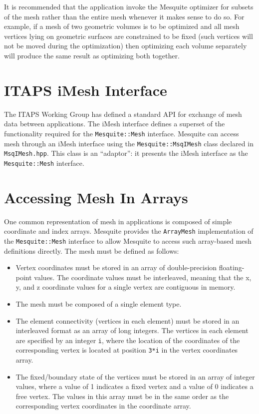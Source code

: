 It is recommended that the application invoke the Mesquite optimizer for subsets
of the mesh rather than the entire mesh whenever it makes sense to do so.  For
example, if a mesh of two geometric volumes is to be optimized and all mesh
vertices lying on geometric surfaces are constrained to be fixed (such vertices
will not be moved during the optimization) then optimizing each volume separately
will produce the same result as optimizing both together.  


\section{ITAPS iMesh Interface}

The ITAPS Working Group has defined a standard API for exchange of mesh data between applications.  The iMesh interface\cite{imesh} defines a superset of the functionality required for the \texttt{Mesquite::Mesh} interface.  Mesquite can access mesh through an iMesh interface using the \texttt{Mesquite::MsqIMesh} class declared in \texttt{MsqIMesh.hpp}.  This class is an ``adaptor'':  it presents the iMesh interface as the \texttt{Mesquite::Mesh} interface.  


\section{Accessing Mesh In Arrays} \label{sec::ArrayMesh}

One common representation of mesh in applications is composed of simple 
coordinate and index arrays.  Mesquite provides the \texttt{ArrayMesh} implementation of the \texttt{Mesquite::Mesh} interface to allow Mesquite
to access such array-based mesh definitions directly.  The mesh must be
defined as follows:
\begin{itemize}
\item Vertex coordinates must be stored in an array of double-precision
      floating-point values.  The coordinate values must be interleaved,
      meaning that the x, y, and z coordinate values for a single vertex
      are contiguous in memory.
\item The mesh must be composed of a single element type.
\item The element connectivity (vertices in each element) must be stored
      in an interleaved format as an array of long integers.  The vertices
      in each element are specified by an integer \texttt{i}, where the location       of the coordinates of the corresponding vertex is located at position
      \texttt{3*i} in the vertex coordinates array.
\item The fixed/boundary state of the vertices must be stored in an array
      of integer values, where a value of 1 indicates a fixed vertex and a 
      value of 0 indicates a free vertex.  The values in this array must
      be in the same order as the corresponding vertex coordinates in the
      coordinate array.
\end{itemize}

